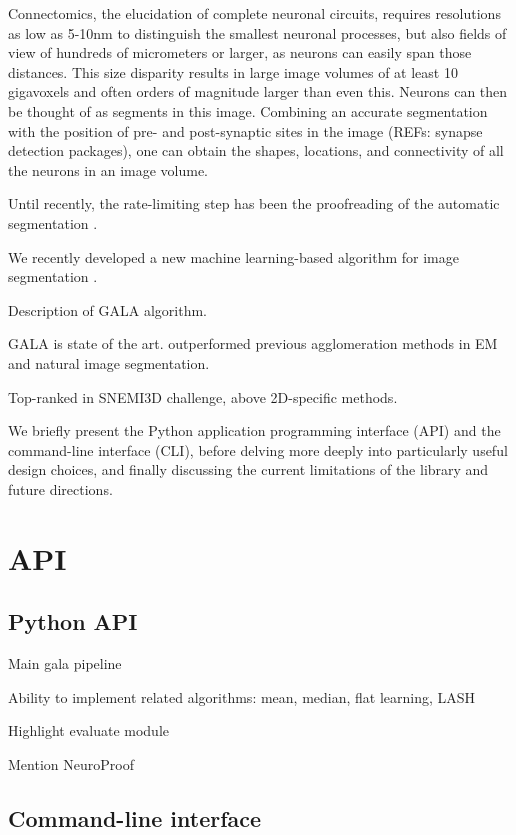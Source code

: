 \documentclass{frontiersSCNS} %
\begin{document}
Connectomics, the elucidation of complete neuronal circuits, requires resolutions as low as 5-10nm to distinguish the smallest neuronal processes, but also fields of view of hundreds of micrometers or larger, as neurons can easily span those distances.
This size disparity results in large image volumes of at least 10 gigavoxels and often orders of magnitude larger than even this.
Neurons can then be thought of as segments in this image.
Combining an accurate segmentation with the position of pre- and post-synaptic sites in the image (REFs: synapse detection packages), one can obtain the shapes, locations, and connectivity of all the neurons in an image volume.

Until recently, the rate-limiting step has been the proofreading of the automatic segmentation \citep{Chklovskii:2010df}.

We recently developed a new machine learning-based algorithm for image segmentation \citep{NunezIglesias:2013cd}.

Description of GALA algorithm.

GALA is state of the art. outperformed previous agglomeration methods in EM and natural image segmentation.

Top-ranked in SNEMI3D challenge, above 2D-specific methods.

We briefly present the Python application programming interface (API) and the command-line interface (CLI), before delving more deeply into particularly useful design choices, and finally discussing the current limitations of the library and future directions.


\section{API}


\subsection{Python API}

Main gala pipeline

Ability to implement related algorithms: mean, median, flat learning, LASH

Highlight evaluate module

Mention NeuroProof


\subsection{Command-line interface}
\end{document}
